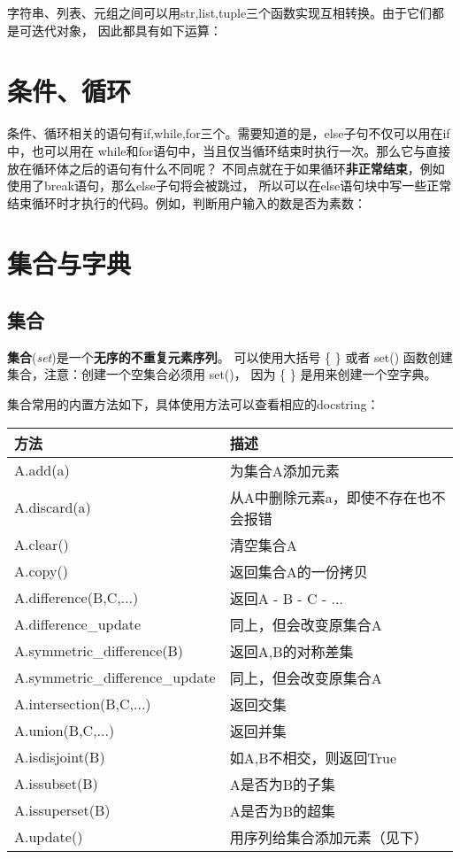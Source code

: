 \documentclass{style/ucasproposal}
\begin{document}
字符串、列表、元组之间可以用str,list,tuple三个函数实现互相转换。由于它们都是可迭代对象，
因此都具有如下运算：


\section{条件、循环}
条件、循环相关的语句有if,while,for三个。需要知道的是，else子句不仅可以用在if中，也可以用在
while和for语句中，当且仅当循环结束时执行一次。那么它与直接放在循环体之后的语句有什么不同呢？
不同点就在于如果循环\textbf{非正常结束}，例如使用了break语句，那么else子句将会被跳过，
所以可以在else语句块中写一些正常结束循环时才执行的代码。例如，判断用户输入的数是否为素数：

\section{集合与字典}
\subsection{集合}
\textbf{集合}(\textit{set})是一个\textbf{无序的不重复元素序列}。
可以使用大括号 \{ \} 或者 set() 函数创建集合，注意：创建一个空集合必须用 set()，
因为 \{ \} 是用来创建一个空字典。 

集合常用的内置方法如下，具体使用方法可以查看相应的docstring：
\begin{center}
	\begin{tabular}{ll}
		\hline
		方法 & 描述\\
		\hline
		A.add(a) & 为集合A添加元素\\
		A.discard(a) & 从A中删除元素a，即使不存在也不会报错\\
		A.clear() & 清空集合A\\
		A.copy() & 返回集合A的一份拷贝\\
		A.difference(B,C,...) & 返回A - B - C - ...\\
		A.difference\_update & 同上，但会改变原集合A\\
		A.symmetric\_difference(B) & 返回A,B的对称差集\\
		A.symmetric\_difference\_update & 同上，但会改变原集合A\\
		A.intersection(B,C,...) & 返回交集\\
		A.union(B,C,...) & 返回并集\\
		A.isdisjoint(B) & 如A,B不相交，则返回True\\
		A.issubset(B) & A是否为B的子集\\
		A.issuperset(B) & A是否为B的超集\\
		A.update() & 用序列给集合添加元素（见下）\\
		\hline
	\end{tabular}
\end{center}
\end{document}

